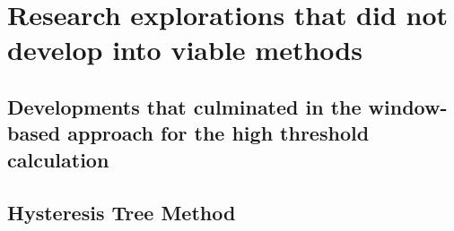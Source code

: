 \chapter{Research explorations that did not develop into viable methods}

\section{Developments that culminated in the window-based approach for the high threshold calculation}\label{sec:history_to_windows}

\section{Hysteresis Tree Method}

